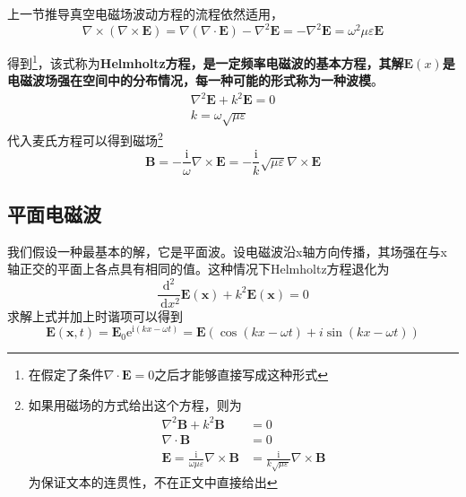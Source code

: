         上一节推导真空电磁场波动方程的流程依然适用，
        \begin{equation}
            \boxed{\nabla \times (\nabla \times \boldsymbol{E}) = \nabla(\nabla \cdot \boldsymbol{E})-\nabla^2 \boldsymbol{E}=-\nabla^2 \boldsymbol{E} = \omega^2 \mu \varepsilon \boldsymbol{E}}
        \end{equation}
        
        得到\footnote{\label{ft.4_1_3}在假定了条件$\nabla \cdot \boldsymbol{E}=0$之后才能够直接写成这种形式}，该式称为\textbf{Helmholtz方程，是一定频率电磁波的基本方程，其解$\boldsymbol{E}(x)$是电磁波场强在空间中的分布情况，每一种可能的形式称为一种波模}。
        \begin{equation}
            \begin{gathered}
            \nabla^{2} \boldsymbol{E}+k^{2} \boldsymbol{E}=0 \\
            k=\omega \sqrt{\mu \varepsilon}
            \end{gathered}
            \end{equation} 
        代入麦氏方程可以得到磁场\footnote{如果用磁场的方式给出这个方程，则为\[\begin{aligned}
            \nabla^{2} \boldsymbol{B}+k^{2} \boldsymbol{B} &=0 \\
            \nabla \cdot \boldsymbol{B} &=0 \\
            \boldsymbol{E}=\frac{\mathrm{i}}{\omega \mu \varepsilon} \nabla \times \boldsymbol{B} &=\frac{\mathrm{i}}{k \sqrt{\mu \varepsilon}} \nabla \times \boldsymbol{B}
            \end{aligned}\]
            为保证文本的连贯性，不在正文中直接给出}
        \begin{equation}
            \label{eq.4.11}
            \boldsymbol{B}=-\frac{\mathrm{i}}{\omega} \nabla \times \boldsymbol{E}=-\frac{\mathrm{i}}{k} \sqrt{\mu \varepsilon} \nabla \times \boldsymbol{E}
        \end{equation}
    \subsection{平面电磁波}      
        我们假设一种最基本的解，它是平面波。设电磁波沿x轴方向传播，其场强在与x轴正交的平面上各点具有相同的值。这种情况下Helmholtz方程退化为
        \begin{equation}
            \frac{\mathrm{d}^{2}}{\mathrm{~d} x^{2}} \boldsymbol{E}(\boldsymbol{x})+k^{2} \boldsymbol{E}(\boldsymbol{x})=0
        \end{equation}
        求解上式并加上时谐项可以得到
        \begin{equation}
            \boldsymbol{E}(\boldsymbol{x}, t)=\boldsymbol{E}_{0} \mathrm{e}^{\mathrm{i}(k x-\omega t)} = \boldsymbol{E}(\cos(kx-\omega t)+i \sin(kx-\omega t))
        \end{equation}

